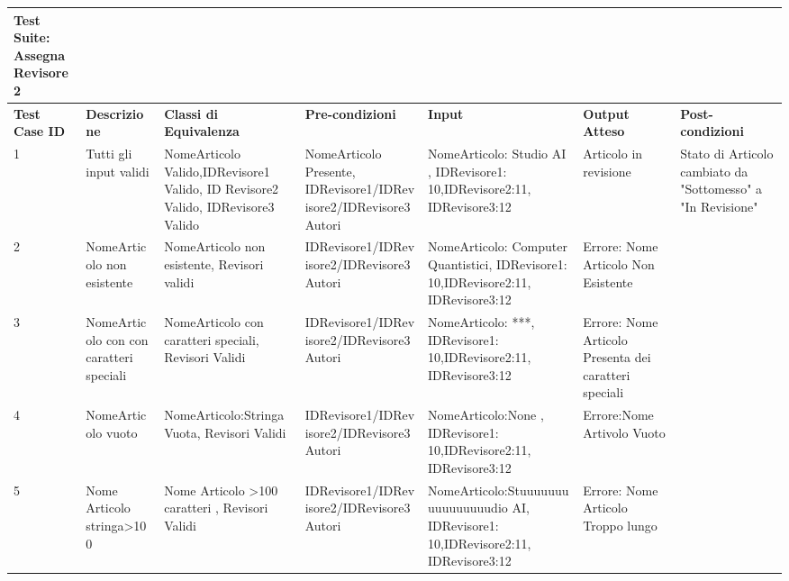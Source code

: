 \begin{sidewaystable}
\begin{tabular}{|p{3cm}|p{2cm}|p{2cm}|p{2cm}|p{4cm}|p{2cm}|p{2cm}|}
\hline
\rowcolor{SkyBlue}
\textbf{Test Suite: Assegna Revisore 2} & & & & & &\\
\hline
\rowcolor{Red}
\textbf{Test Case ID} & \textbf{Descrizione} & \textbf{Classi di Equivalenza} & \textbf{Pre-condizioni} & \textbf{Input} & \textbf{Output Atteso} & \textbf{Post-condizioni} \\
\hline
1& Tutti gli input validi &NomeArticolo Valido,IDRevisore1 Valido, ID Revisore2 Valido, IDRevisore3 Valido&NomeArticolo Presente, IDRevisore1/IDRevisore2/IDRevisore3 Autori& NomeArticolo: Studio AI , IDRevisore1: 10,IDRevisore2:11, IDRevisore3:12&Articolo in revisione& Stato di Articolo cambiato da "Sottomesso" a "In Revisione"\\
\hline
2& NomeArticolo non esistente&NomeArticolo non esistente, Revisori validi& IDRevisore1/IDRevisore2/IDRevisore3 Autori& NomeArticolo: Computer Quantistici, IDRevisore1: 10,IDRevisore2:11, IDRevisore3:12&Errore: Nome Articolo Non Esistente&\\
\hline
3& NomeArticolo con con caratteri speciali& NomeArticolo con caratteri speciali, Revisori Validi & IDRevisore1/IDRevisore2/IDRevisore3 Autori& NomeArticolo: ***, IDRevisore1: 10,IDRevisore2:11, IDRevisore3:12&Errore: Nome Articolo Presenta dei caratteri speciali &\\
\hline
4&NomeArticolo vuoto & NomeArticolo:Stringa Vuota, Revisori Validi & IDRevisore1/IDRevisore2/IDRevisore3 Autori& NomeArticolo:None , IDRevisore1: 10,IDRevisore2:11, IDRevisore3:12&Errore:Nome Artivolo Vuoto&\\
\hline
5&Nome Articolo stringa>100 &Nome Articolo >100 caratteri , Revisori Validi & IDRevisore1/IDRevisore2/IDRevisore3 Autori&NomeArticolo:Stuuuuuuuuuuuuuuuudio AI,  IDRevisore1: 10,IDRevisore2:11, IDRevisore3:12&Errore: Nome Articolo Troppo lungo&\\
\hline 
\end{tabular}
\end{sidewaystable}

